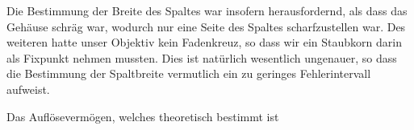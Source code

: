 \documentclass[12pt,a4paper,titlepage,headinclude,bibtotoc]{scrartcl}
\begin{document}
Die Bestimmung der Breite des Spaltes war insofern herausfordernd, als dass das Gehäuse schräg war, wodurch nur eine Seite des Spaltes scharfzustellen war.
Des weiteren hatte unser Objektiv kein Fadenkreuz, so dass wir ein Staubkorn darin als Fixpunkt nehmen mussten.
Dies ist natürlich wesentlich ungenauer, so dass die Bestimmung der Spaltbreite vermutlich ein zu geringes Fehlerintervall aufweist.

Das Auflösevermögen, welches theoretisch bestimmt ist





\end{document}
